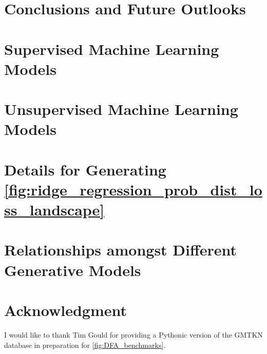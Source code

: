 \documentclass[%
aip,
rmp,
10pt, 
amsmath,
amssymb,
floatfix,
nofootinbib,
]{revtex4-2}
\begin{document}

\section{Conclusions and Future Outlooks}
\label{sec:conclusion_outlook}




\section{Supervised Machine Learning Models}
\label{appendix:supervised_ML}



   
   
    

\section{Unsupervised Machine Learning Models}
\label{appendix:unsupervised_ML}


\section{Details for Generating \cref{fig:ridge_regression_prob_dist_loss_landscape}}
\label{appendix:details_ridge_regression_loss_landscape}


\section{Relationships amongst Different Generative Models}
\label{appendix:generative_model_relations}



\section*{Acknowledgment}
I would like to thank Tim Gould for providing a Pythonic version of the GMTKN database in preparation for \cref{fig:DFA_benchmarks}.


\newpage 
\small


\end{document}
